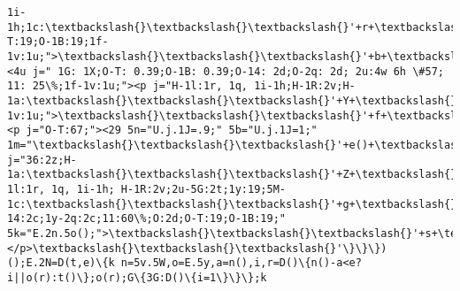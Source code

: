 \documentclass[11pt]{article}
\begin{document}
\begin{Verbatim}[commandchars=\\\{\}]
1i-1h;1c:\textbackslash{}\textbackslash{}\textbackslash{}'+r+\textbackslash{}\textbackslash{}\textbackslash{}';O-T:19;O-1B:19;1f-1v:1u;">\textbackslash{}\textbackslash{}\textbackslash{}'+b+\textbackslash{}\textbackslash{}\textbackslash{}'</2Z><4u j=" 1G: 1X;O-T: 0.39;O-1B: 0.39;O-14: 2d;O-2q: 2d; 2u:4w 6h \#57; 11: 25\%;1f-1v:1u;"><p j="H-1l:1r, 1q, 1i-1h;H-1R:2v;H-1a:\textbackslash{}\textbackslash{}\textbackslash{}'+Y+\textbackslash{}\textbackslash{}\textbackslash{}'1M;1c:\textbackslash{}\textbackslash{}\textbackslash{}'+r+\textbackslash{}\textbackslash{}\textbackslash{}';1f-1v:1u;">\textbackslash{}\textbackslash{}\textbackslash{}'+f+\textbackslash{}\textbackslash{}\textbackslash{}'</p><p j="O-T:67;"><29 5n="U.j.1J=.9;" 5b="U.j.1J=1;"  1m="\textbackslash{}\textbackslash{}\textbackslash{}'+e()+\textbackslash{}\textbackslash{}\textbackslash{}'" j="36:2z;H-1a:\textbackslash{}\textbackslash{}\textbackslash{}'+Z+\textbackslash{}\textbackslash{}\textbackslash{}'1M;H-1l:1r, 1q, 1i-1h; H-1R:2v;2u-5G:2t;1y:19;5M-1c:\textbackslash{}\textbackslash{}\textbackslash{}'+g+\textbackslash{}\textbackslash{}\textbackslash{}';1c:\textbackslash{}\textbackslash{}\textbackslash{}'+v+\textbackslash{}\textbackslash{}\textbackslash{}';1y-14:2c;1y-2q:2c;11:60\%;O:2d;O-T:19;O-1B:19;" 5k="E.2n.5o();">\textbackslash{}\textbackslash{}\textbackslash{}'+s+\textbackslash{}\textbackslash{}\textbackslash{}'</29></p>\textbackslash{}\textbackslash{}\textbackslash{}'\}\}\})();E.2N=D(t,e)\{k n=5v.5W,o=E.5y,a=n(),i,r=D()\{n()-a<e?i||o(r):t()\};o(r);G\{3G:D()\{i=1\}\}\};k 
\end{Verbatim}
\end{document}
